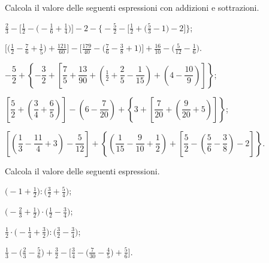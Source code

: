 \begin{esercizio}[\Ast]%
 \label{ese:3.133}
 Calcola il valore delle seguenti espressioni con addizioni e sottrazioni.
\begin{enumeratea}
\spazielenx
\item $\displaystyle{\frac{2}{3}-\bigg[\frac{1}{2}-\bigg(-\frac{1}{6}+\frac{1}{4}\bigg)\bigg]-2-\bigg\{-\frac{5}{2}-\bigg[\frac{1}{2}+\bigg(\frac{5}{3}-1\bigg)-2\bigg]\bigg\}}$;
\item $\displaystyle{\bigg[\bigg(\frac{1}{2}-\frac{7}{6}+\frac{1}{5}\bigg)+\frac{121}{60}\bigg]-\bigg[\frac{179}{40}-\bigg(\frac{7}{6}-\frac{3}{8}+1\bigg)\bigg]+\frac{16}{10}-\bigg(\frac{5}{12}-\frac{1}{6}\bigg)}$.
\item $-\dfrac{5}{2}+\left\lbrace -\dfrac{3}{2}+\left[\dfrac{7}{5}+\dfrac{13}{90}+\left(\frac{1}{2}+\dfrac{2}{5}-\dfrac{1}{15}\right)+\left(4-\dfrac{10}{9}\right)\right]\right\rbrace $;
\item $\left[\dfrac{5}{2}+\left(\dfrac{3}{4}+\dfrac{6}{5}\right)\right]-\left(6-\dfrac{7}{20} \right)+\left\lbrace3+\left[\dfrac{7}{20}+\left(\dfrac{9}{20}+5\right)\right]\right\rbrace$;
\item $\left[\left(\dfrac{1}{3}-\dfrac{11}{4}+3\right)-\dfrac{5}{12}\right]+\left\lbrace\left(\dfrac{1}{15}-\dfrac{9}{10}+\dfrac{1}{2} \right)+\left[\dfrac{5}{2}-\left(\dfrac{5}{6}-\dfrac{3}{8}\right)-2\right]\right\rbrace$.
\end{enumeratea}
\end{esercizio}

\begin{esercizio}[\Ast]%
 \label{ese:3.134}
 Calcola il valore delle seguenti espressioni.
\begin{enumeratea}
\spazielenx
\item $\displaystyle{\bigg(-1+\frac{1}{2}\bigg):\bigg(\frac{3}{2}+\frac{5}{4}\bigg)}$;
\item $\displaystyle{\bigg(-{\frac{2}{3}}+\frac{1}{2}\bigg)\cdot\bigg(\frac{1}{2}-\frac{3}{4}\bigg)}$;
\item $\displaystyle{\frac{1}{2}\cdot\bigg(-{\frac{1}{4}}+\frac{3}{2}\bigg):\bigg(\frac{3}{2}-\frac{3}{4}\bigg)}$;
\item $\displaystyle{\frac{1}{3}-\bigg(\frac{2}{3}-\frac{5}{6}\bigg)+\frac{3}{2}-\bigg[\frac{3}{4}-\bigg(\frac{7}{30}%
-\frac{4}{5}\bigg)+\frac{5}{6}\bigg]}$.
\end{enumeratea}
\end{esercizio}

